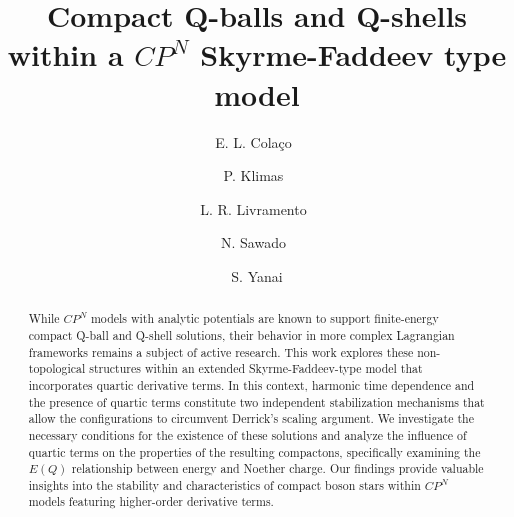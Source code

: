\documentclass[aps,prd,superscriptaddress,notitlepage,11pt,final,longbibliography,nofootinbib]{revtex4-1}
\numberwithin{equation}{section}
\begin{document}
\title{Compact Q-balls and Q-shells within a $CP^N$  Skyrme-Faddeev type model}
\author{E. L. Cola\c co~}
\author{P. Klimas~}

\author{L. R. Livramento~}

\author{N. Sawado~}

\author{S. Yanai}

\begin{abstract}

\end{abstract}


\begin{abstract}
While $CP^N$ models with analytic potentials are known to support finite-energy compact Q-ball and Q-shell solutions, their behavior in more complex Lagrangian frameworks remains a subject of active research. This work explores these non-topological structures within an extended Skyrme-Faddeev-type model that incorporates quartic derivative terms. In this context, harmonic time dependence and the presence of quartic terms constitute two independent stabilization mechanisms that allow the configurations to circumvent Derrick's scaling argument. We investigate the necessary conditions for the existence of these solutions and analyze the influence of quartic terms on the properties of the resulting compactons, specifically examining the $E(Q)$ relationship between energy and Noether charge. Our findings provide valuable insights into the stability and characteristics of compact boson stars within $CP^N$ models featuring higher-order derivative terms.
\end{abstract}
\end{document}

